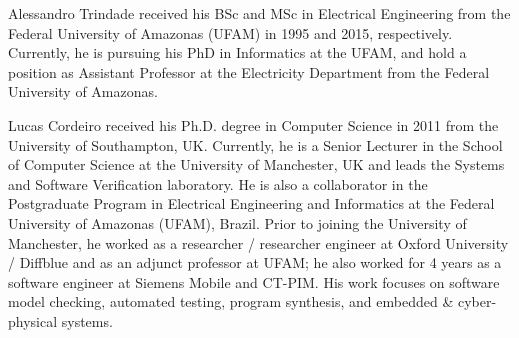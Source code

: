 \documentclass[journal]{IEEEtran}
\begin{document}


{}
%


% 

\begin{IEEEbiographynophoto}{Alessandro Trindade}
received his BSc and MSc in Electrical Engineering from the Federal University of Amazonas (UFAM) in 1995 and 2015, respectively. Currently, he is pursuing his PhD in Informatics at the UFAM, and hold a position as Assistant Professor at the Electricity Department from the Federal University of Amazonas.
\end{IEEEbiographynophoto}

\begin{IEEEbiographynophoto}{Lucas Cordeiro}
received his Ph.D. degree in Computer Science in 2011 from the University of Southampton, UK. Currently, he is a Senior Lecturer in the School of Computer Science at the University of Manchester, UK and leads the Systems and Software Verification laboratory. He is also a collaborator in the Postgraduate Program in Electrical Engineering and Informatics at the Federal University of Amazonas (UFAM), Brazil. Prior to joining the University of Manchester, he worked as a researcher / researcher engineer at Oxford University / Diffblue and as an adjunct professor at UFAM; he also worked for 4 years as a software engineer at Siemens Mobile and CT-PIM. His work focuses on software model checking, automated testing, program synthesis, and embedded \& cyber-physical systems.
\end{IEEEbiographynophoto}
\end{document}
